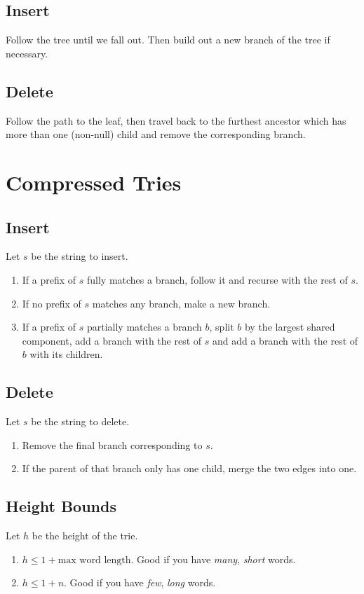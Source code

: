 \documentclass[12pt, letterpaper]{article}
\begin{document}
\begin{multicols*}{3}
        \subsection{Insert}
        Follow the tree until we fall out. Then build out a new branch of the tree if necessary.

        \subsection{Delete}
        Follow the path to the leaf, then travel back to the furthest ancestor which has more than one (non-null) child and remove the corresponding branch.
        
        \section{Compressed Tries}

        \subsection{Insert}
        Let $s$ be the string to insert.
        \begin{enumerate}
            \item If a prefix of $s$ fully matches a branch, follow it and recurse with the rest of $s$. 
            \item If no prefix of $s$ matches any branch, make a new branch.
            \item If a prefix of $s$ partially matches a branch $b$, split $b$ by the largest shared component, add a branch with the rest of $s$ and add a branch with the rest of $b$ with its children.
        \end{enumerate}



        \subsection{Delete}
        Let $s$ be the string to delete.
        \begin{enumerate}
            \item Remove the final branch corresponding to $s$.
            \item If the parent of that branch only has one child, merge the two edges into one.
        \end{enumerate}


        \subsection{Height Bounds}
        Let $h$ be the height of the trie.
        \begin{enumerate}
            \item $h \le 1 + \text{max word length}$. Good if you have {\it many}, {\it short} words.
            \item $h \le 1 + n$. Good if you have {\it few}, {\it long} words.
        \end{enumerate}
        

\end{multicols*}
\end{document}
